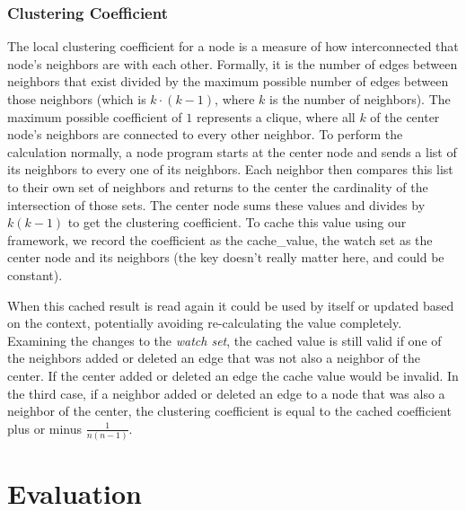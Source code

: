 \documentclass[letterpaper,twocolumn,11pt,tight]{article}
\begin{document}
\subsubsection{Clustering Coefficient}\label{sec:clustering}
The local clustering coefficient for a node is a measure of how interconnected that node's neighbors are with each other.
Formally, it is the number of edges between neighbors that exist divided by the maximum possible number of edges between those neighbors (which is $k\cdot(k-1)$, where $k$ is the number of neighbors).
The maximum possible coefficient of $1$ represents a clique, where all $k$ of the center node's neighbors are connected to every other neighbor.
To perform the calculation normally, a node program starts at the center node and sends a list of its neighbors to every one of its neighbors.
Each neighbor then compares this list to their own set of neighbors and returns to the center the cardinality of the intersection of those sets.
The center node sums these values and divides by $k(k-1)$ to get the clustering coefficient. To cache this value using our framework, we record the coefficient as the cache\_value, the watch set as the center node and its neighbors (the key doesn't really matter here, and could be constant).

    When this cached result is read again it could be used by itself or updated based on the context, potentially avoiding re-calculating the value completely. Examining the changes to the \emph{watch set}, the cached value is still valid if one of the neighbors added or deleted an edge that was not also a neighbor of the center. If the center added or deleted an edge the cache value would be invalid. In the third case, if a neighbor added or deleted an edge to a node that was also a neighbor of the center, the clustering coefficient is equal to the cached coefficient plus or minus $\frac1{n(n-1)}$. 
\section{Evaluation}\label{sec:eval}
\end{document}
